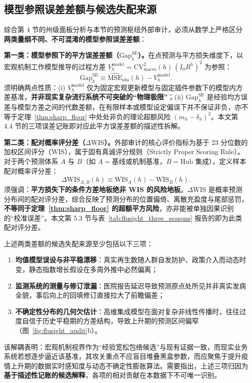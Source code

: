 \documentclass[11pt,a4paper]{article}
\theoremstyle{plain}
\theoremstyle{definition}
\begin{document}
\subsection{模型参照误差差额与候选失配来源}\label{sec:gap_attribution}

综合第 4 节的州级面板分析与本节的预测枢纽外部审计，必须从数学上严格区分\textbf{两类量纲不同、不可混淆的模型参照误差差额}：

\noindent\textbf{第一类：模型参照下的平方误差差额（$\mathrm{Gap}^{\text{SE}}_h$）。}在点预测与平方损失维度下，以宏观机制工作模型推导的过程方差 $V^{\text{model}}_h = \text{CV}^2_{\text{macro}}(h)\,(I_0 R^h)^2$ 为参照：
\begin{equation}
\mathrm{Gap}^{\text{SE}}_h \equiv \widehat{\text{MSE}}_{\text{obs}}(h) - V^{\text{model}}_h.
\label{eq:gap_se}
\end{equation}
须明确两点性质：(i) $V^{\text{model}}_h$ 仅为固定宏观更新模型与固定插件参数下的模型内方差基准，\textbf{并非现实复杂流行系统不可突破的“物理极限”}；(ii) $\mathrm{Gap}^{\text{SE}}_h$ 是经验均方误差与模型方差之间的代数差额，在有限样本或模型设定偏误下并不保证非负，亦不等于定理~\ref{thm:sharp_floor} 中处处非负的理论超额风险 $(m_h - \delta_h)^2$。本文第 4.4 节的三项误差记账即对应此平方误差差额的描述性拆解。

\noindent\textbf{第二类：配对概率评分差（$\Delta\text{WIS}$）。}外部审计的核心评价指标为基于 23 分位数的加权区间评分（WIS），属于固有真诚评分规则（Strictly Proper Scoring Rule）。对于两个预测体系 $A$ 与 $B$（如 $A = \text{基线或机制基准}$，$B = \text{Hub 集成}$），定义样本配对概率评分差：
\begin{equation}
\Delta\mathrm{WIS}_{A, B}(h) \equiv \overline{\mathrm{WIS}}_A(h) - \overline{\mathrm{WIS}}_B(h).
\label{eq:gap_wis}
\end{equation}
须强调：\textbf{平方损失下的条件方差地板绝非 WIS 的风险地板}。$\Delta\mathrm{WIS}$ 是概率预测分布间的配对评分差，综合反映了预测分布的位置偏倚、离散充盈度与尾部惩罚，\textbf{不等同于定理~\ref{thm:sharp_floor} 的超额平方风险}，亦非能被单独因果识别的“校准误差”。本文第 5.3 节与表~\ref{tab:flusight_three_seasons} 报告的即为此类配对评分差。

上述两类差额的候选失配来源至少包括以下三项：
\begin{enumerate}
\item \textbf{均值模型误设与非平稳漂移}：真实再生数随人群自发防护、政策介入而动态时变，静态指数增长假设在多周外推中必然偏离；
\item \textbf{监测系统的测量与修订泄漏}：医院报告延迟导致预测原点处所见并非真实发病全貌，事后向上的回填修订直接拉大了前瞻偏差；
\item \textbf{不确定性分布的几何欠估计}：高维集成模型在面对复杂非线性传播时，往往过度自信于历史平稳期的方差结构，导致上升期的预测区间偏窄（图~\ref{fig:flusight_audit}b）。
\end{enumerate}
该解耦表明：宏观机制视界作为“经验宽松包络候选”与现有证据一致，而现实业务系统若想逐步逼近该基准，其攻关重点不应盲目堆叠黑盒参数，而应聚焦于提升疫情上升期的数据实时感知度与动态不确定性膨胀算法。需要指出，上述三项归因为\textbf{基于描述性记账的候选解释}，各项的相对贡献在本数据下不可唯一识别。
\end{document}
